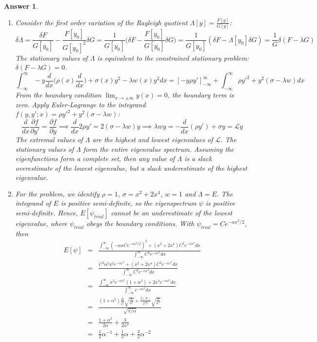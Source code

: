 \documentclass[a4paper]{article}
\newtheorem{ans}{Answer}[section]
\theoremstyle{new}
\begin{document}
\begin{ans}\leavevmode
\begin{enumerate}[label=(\alph*)]
\item Consider the first order variation of the Rayleigh quotient $\Lambda[y]=\frac{F[y]}{G[y]}$:
$$\delta\Lambda=\frac{\delta F}{G[y_0]}-\frac{F[y_0]}{G[y_0]^2}\delta G=\frac{1}{G[y_0]}\bigg(\delta F-\frac{F[y_0]}{G[y_0]}\delta G\bigg)=\frac{1}{G[y_0]}(\delta F-\Lambda[y_0]\delta G)=\frac{1}{G}\delta(F-\lambda G)$$
The stationary values of $\Lambda$ is equivalent to the constrained stationary problem: $\delta (F-\lambda G)=0$.
$$\int_{-\infty}^\infty -y\frac{d}{dx}\bigg(\rho(x)\frac{d}{dx}\bigg)+\sigma(x)y^2-\lambda w(x)y^2dx=[-y\rho y']_{-\infty}^\infty+\int_{-\infty}^\infty\rho y'^2+y^2(\sigma-\lambda w)dx$$
From the boundary condition $\lim_{x\rightarrow\pm\infty}y(x)=0$, the boundary term is zero. Apply Euler-Lagrange to the integrand $f(y,y';x)=\rho y'^2+y^2(\sigma-\lambda w)$:
$$\frac{d}{dx}\frac{\partial f}{\partial y'}=\frac{\partial f}{\partial y}\implies\frac{d}{dx}2\rho y'=2(\sigma-\lambda w)y\implies\lambda wy=-\frac{d}{dx}(\rho y')+\sigma y=\mathcal{L}y$$
The extremal values of $\Lambda$ are the highest and lowest eigenvalues of $\mathcal{L}$. The stationary values of $\Lambda$ form the entire eigenvalue spectrum. Assuming the eigenfunctions form a complete set, then any value of $\Lambda$ is a slack overestimate of the lowest eigenvalue, but a slack underestimate of the highest eigenvalue.
\item For the problem, we identify $\rho=1$, $\sigma=x^2+2x^4$, $w=1$ and $\Lambda=E$. The integrand of $E$ is positive semi-definite, so the eigenspectrum $\psi$ is positive semi-definite. Hence, $E[\psi_{trial}]$ cannot be an underestimate of the lowest eigenvalue, where $\psi_{trial}$ obeys the boundary conditions. With $\psi_{trial}=Ce^{-\alpha x^2/2}$, then
\begin{eqnarray}
E[\psi]&=&\frac{\int_{-\infty}^\infty(-\alpha xCe^{-\alpha x^2/2})^2+(x^2+2x^4)C^2e^{-\alpha x^2}dx}{\int_{-\infty}^\infty C^2e^{-\alpha x^2}dx}\nonumber\\&=&\frac{C^2\alpha^2x^2e^{-\alpha x^2}+(x^2+2x^4)C^2e^{-\alpha x^2}dx}{\int_{-\infty}^\infty C^2e^{-\alpha x^2}dx}\nonumber\\&=&\frac{\int_{-\infty}^\infty x^2e^{-\alpha x^2}(1+\alpha^2)+2x^4e^{-\alpha x^2}dx}{\int_{-\infty}^\infty e^{-\alpha x^2}dx}\nonumber\\&=&\frac{(1+\alpha^2)\frac{2!}{2^2}\sqrt{\frac{\pi}{\alpha^3}}+\frac{2(4!)}{2^42!}\sqrt{\frac{\pi}{\alpha^5}}}{\sqrt{\pi/\alpha}}\nonumber\\&=&\frac{1+\alpha^2}{2\alpha}+\frac{3}{2\alpha^2}\nonumber\\&=&\frac{1}{2}\alpha^{-1}+\frac{1}{2}\alpha+\frac{3}{2}\alpha^{-2}\nonumber

\end{eqnarray}
\end{enumerate}
\end{ans}
\end{document}
